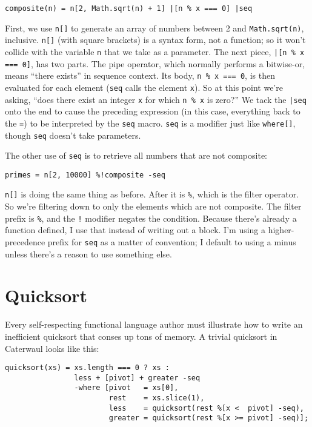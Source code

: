 \documentclass{report}
\begin{document}
\begin{verbatim}
composite(n) = n[2, Math.sqrt(n) + 1] |[n % x === 0] |seq
\end{verbatim}

    First, we use {\tt n[]} to generate an array of numbers between 2 and {\tt Math.sqrt(n)}, inclusive. {\tt n[]} (with square brackets) is a syntax form, not a function; so it won't collide
    with the variable {\tt n} that we take as a parameter. The next piece, \verb+|[n % x === 0]+, has two parts. The pipe operator, which normally performs a bitwise-or, means ``there exists''
    in sequence context. Its body, \verb|n % x === 0|, is then evaluated for each element ({\tt seq} calls the element {\tt x}). So at this point we're asking, ``does there exist an integer
    {\tt x} for which {\tt n \% x} is zero?'' We tack the \verb+|seq+ onto the end to cause the preceding expression (in this case, everything back to the {\tt =}) to be interpreted by the
    {\tt seq} macro. {\tt seq} is a modifier just like {\tt where[]}, though {\tt seq} doesn't take parameters.

    The other use of {\tt seq} is to retrieve all numbers that are not composite:

\begin{verbatim}
primes = n[2, 10000] %!composite -seq
\end{verbatim}

    {\tt n[]} is doing the same thing as before. After it is {\tt \%}, which is the filter operator. So we're filtering down to only the elements which are not composite. The filter prefix is
    \verb|%|, and the \verb|!| modifier negates the condition. Because there's already a function defined, I use that instead of writing out a block. I'm using a higher-precedence prefix for
    {\tt seq} as a matter of convention; I default to using a minus unless there's a reason to use something else.

\chapter{Quicksort}\label{sec:quicksort}
  Every self-respecting functional language author must illustrate how to write an inefficient quicksort that conses up tons of memory. A trivial quicksort in Caterwaul looks like this:

\begin{verbatim}
quicksort(xs) = xs.length === 0 ? xs :
                less + [pivot] + greater -seq
                -where [pivot   = xs[0],
                        rest    = xs.slice(1),
                        less    = quicksort(rest %[x <  pivot] -seq),
                        greater = quicksort(rest %[x >= pivot] -seq)];
\end{verbatim}
\end{document}
